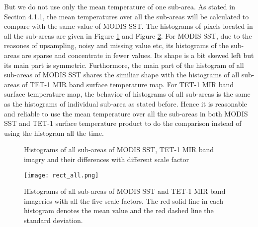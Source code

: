 \noindent But we do not use only the mean temperature of one sub-area. As stated in Section 4.1.1, the mean temperatures over all the sub-areas will be calculated to compare with the same value of MODIS SST. The histograms of pixels located in all the sub-areas are given in Figure \ref{fig:hist_all_rect} and Figure \ref{fig:rect_all_sc_all}. For MODIS SST, due to the reasones of upsampling, noisy and missing value etc, its histograms of the sub-areas are sparse and concentrate in fewer values. Its shape is a bit skewed left but its main part is symmetric. Furthormore, the main part of the histogram of all sub-areas of MODIS SST shares the similiar shape with the histograms of all sub-areas of TET-1 MIR band surface temperature map. For TET-1 MIR band surface temperature map, the behavior of histograms of all sub-areas is the same as the histograms of individual sub-area as stated before. Hence it is reasonable and reliable to use the mean temperature over all the sub-areas in both MODIS SST and TET-1 surface temperature product to do the comparison instead of using the histogram all the time.\\

\begin{figure}[!htbp]
\centering
{}
\vspace{0.1in}
\caption{Histograms of all sub-areas of MODIS SST, TET-1 MIR band imagry and their differences with different scale factor}
\label{fig:hist_all_rect}
\end{figure}

\begin{figure}[!htbp]
\centering
\texttt{[image: rect\_all.png]}
\caption{Histograms of all sub-areas of MODIS SST and TET-1 MIR band imageries with all the five scale factors. The red solid line in each histogram denotes the mean value and the red dashed line the standard deviation.}
\label{fig:rect_all_sc_all}
\end{figure}

